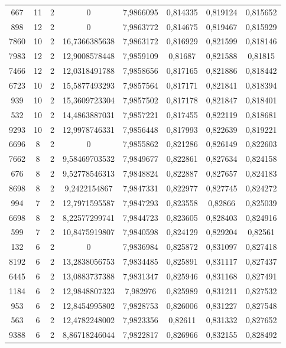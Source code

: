 \begin{longtable}{|c|c|c|c|c|c|c|c|}
667 & 11 & 2 & 0 & 7,9866095 & 0,814335 & 0,819124 & 0,815652 \\
898 & 12 & 2 & 0 & 7,9863772 & 0,814675 & 0,819467 & 0,815929 \\
7860 & 10 & 2 & 16,7366385638 & 7,9863172 & 0,816929 & 0,821599 & 0,818146 \\
7983 & 12 & 2 & 12,9008578448 & 7,9859109 & 0,81687 & 0,821588 & 0,81815 \\
7466 & 12 & 2 & 12,0318491788 & 7,9858656 & 0,817165 & 0,821886 & 0,818442 \\
6723 & 10 & 2 & 15,5877493293 & 7,9857564 & 0,817171 & 0,821841 & 0,818394 \\
939 & 10 & 2 & 15,3609723304 & 7,9857502 & 0,817178 & 0,821847 & 0,818401 \\
532 & 10 & 2 & 14,4863887031 & 7,9857221 & 0,817455 & 0,822119 & 0,818681 \\
9293 & 10 & 2 & 12,9978746331 & 7,9856448 & 0,817993 & 0,822639 & 0,819221 \\
6696 & 8 & 2 & 0 & 7,9855862 & 0,821286 & 0,826149 & 0,822603 \\
7662 & 8 & 2 & 9,58469703532 & 7,9849677 & 0,822861 & 0,827634 & 0,824158 \\
676 & 8 & 2 & 9,52778546313 & 7,9848824 & 0,822887 & 0,827657 & 0,824183 \\
8698 & 8 & 2 & 9,2422154867 & 7,9847331 & 0,822977 & 0,827745 & 0,824272 \\
994 & 7 & 2 & 12,7971595587 & 7,9847293 & 0,823558 & 0,82866 & 0,825039 \\
6698 & 8 & 2 & 8,22577299741 & 7,9844723 & 0,823605 & 0,828403 & 0,824916 \\
599 & 7 & 2 & 10,8475919807 & 7,9840598 & 0,824129 & 0,829204 & 0,82561 \\
132 & 6 & 2 & 0 & 7,9836984 & 0,825872 & 0,831097 & 0,827418 \\
8192 & 6 & 2 & 13,2838056753 & 7,9834485 & 0,825891 & 0,831117 & 0,827437 \\
6445 & 6 & 2 & 13,0883737388 & 7,9831347 & 0,825946 & 0,831168 & 0,827491 \\
1184 & 6 & 2 & 12,9848807323 & 7,982976 & 0,825989 & 0,831211 & 0,827532 \\
953 & 6 & 2 & 12,8454995802 & 7,9828753 & 0,826006 & 0,831227 & 0,827548 \\
563 & 6 & 2 & 12,4782248002 & 7,9823356 & 0,82611 & 0,831332 & 0,827652 \\
9388 & 6 & 2 & 8,86718246044 & 7,9822817 & 0,826966 & 0,832155 & 0,828492 \\

\end{longtable}
